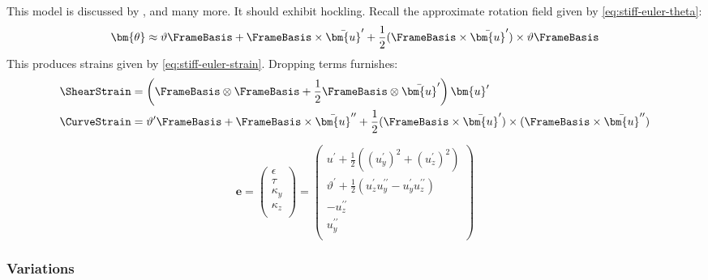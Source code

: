 
This model is discussed by \cite{ziegler1977principles}, \cite{bažant2010stability} and many more. It should exhibit hockling.
Recall the approximate rotation field given by \cref{eq:stiff-euler-theta}:
$$
\bm{\theta} \approx \vartheta \FrameBasis  
+ \FrameBasis \times\bar{\bm{u}}^{\prime} 
+ \frac{1}{2} (\FrameBasis \times\bar{\bm{u}}^{\prime}) \times \vartheta \FrameBasis 
$$
This produces strains given by \cref{eq:stiff-euler-strain}.
Dropping terms furnishes:
\begin{equation}
\begin{aligned}
\ShearStrain &= \left(\FrameBasis \otimes\FrameBasis  + \frac{1}{2}\FrameBasis \otimes\bar{\bm{u}}^{\prime}\right)\bm{u}^{\prime} \\
\CurveStrain &= \vartheta^{\prime} \FrameBasis  
+ \FrameBasis \times\bar{\bm{u}}^{\prime\prime} 
+ \frac{1}{2}(\FrameBasis \times\bar{\bm{u}}^{\prime})\times(\FrameBasis \times\bar{\bm{u}}^{\prime\prime}) 
\end{aligned}
\end{equation}

\begin{equation}
\bm{e} = \begin{pmatrix}
\epsilon \\ 
\tau \\
\kappa_y \\
\kappa_z \\ 
\end{pmatrix}
=\left(\begin{array}{c}
u^{\prime}+\frac{1}{2}\left(\left(u_y^{\prime}\right)^2+\left(u_z^{\prime}\right)^2\right) \\ %
\vartheta^{\prime} +\frac{1}{2}\left(u_{z}^{\prime} u_{y}^{\prime\prime}-u_{y}^{\prime} u_{z}^{\prime\prime}\right)\\
-u_z^{\prime \prime} \\ %
u_y^{\prime \prime} \\ %
\end{array}\right)
\end{equation}

\subsubsection{Variations}

